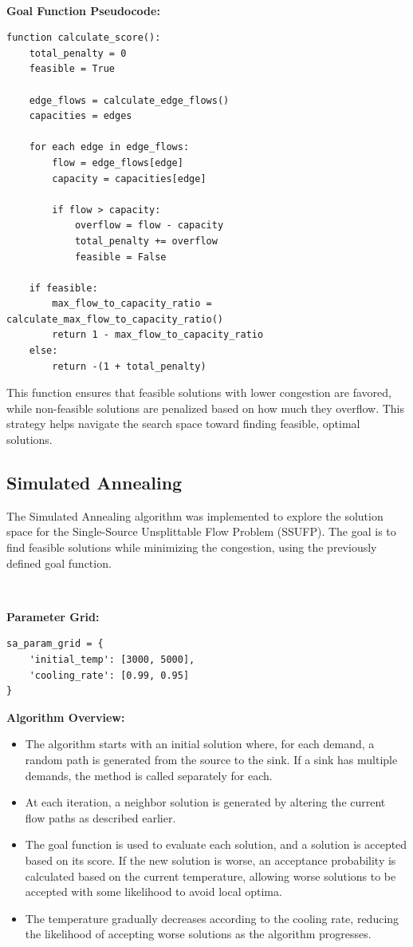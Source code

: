\documentclass[a4paper,12pt]{article}
\begin{document}
\

\noindent \textbf{Goal Function Pseudocode:}

\begin{verbatim}
function calculate_score():
    total_penalty = 0
    feasible = True
    
    edge_flows = calculate_edge_flows()
    capacities = edges

    for each edge in edge_flows:
        flow = edge_flows[edge]
        capacity = capacities[edge]

        if flow > capacity:
            overflow = flow - capacity
            total_penalty += overflow
            feasible = False

    if feasible:
        max_flow_to_capacity_ratio = calculate_max_flow_to_capacity_ratio()
        return 1 - max_flow_to_capacity_ratio
    else:
        return -(1 + total_penalty)
\end{verbatim}

This function ensures that feasible solutions with lower congestion are favored, while non-feasible solutions are penalized based on how much they overflow. This strategy helps navigate the search space toward finding feasible, optimal solutions.

\subsection{Simulated Annealing}

The Simulated Annealing algorithm was implemented to explore the solution space for the Single-Source Unsplittable Flow Problem (SSUFP). The goal is to find feasible solutions while minimizing the congestion, using the previously defined goal function.

\

\noindent \textbf{Parameter Grid:}

\begin{verbatim}
sa_param_grid = {
    'initial_temp': [3000, 5000],
    'cooling_rate': [0.99, 0.95]
}
\end{verbatim}

\noindent \textbf{Algorithm Overview:}
\begin{itemize}
    \item The algorithm starts with an initial solution where, for each demand, a random path is generated from the source to the sink. If a sink has multiple demands, the method is called separately for each.
    \item At each iteration, a neighbor solution is generated by altering the current flow paths as described earlier.
    \item The goal function is used to evaluate each solution, and a solution is accepted based on its score. If the new solution is worse, an acceptance probability is calculated based on the current temperature, allowing worse solutions to be accepted with some likelihood to avoid local optima.
    
    \item The temperature gradually decreases according to the cooling rate, reducing the likelihood of accepting worse solutions as the algorithm progresses.
\end{itemize}
\end{document}
